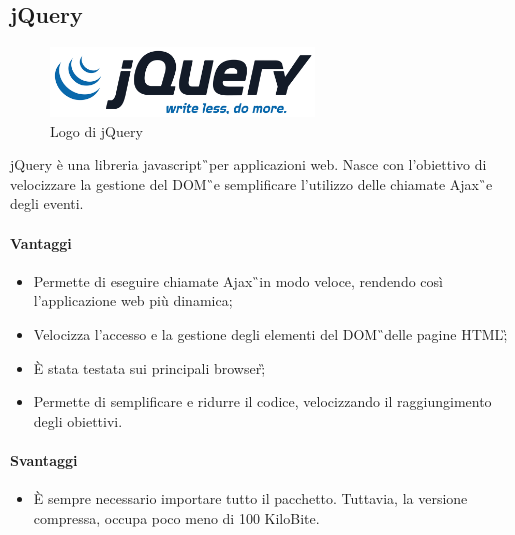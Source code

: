 \subsection{jQuery}
	\begin{figure}[H]
		\begin{center}
			\includegraphics[width=7cm]{Pics/jquery_logo.png}
			\caption{Logo di jQuery}
			\label{fig:jQueryLogo}
		\end{center}
	\end{figure}
	jQuery è una libreria \gls{javascript}\G\ per applicazioni web. Nasce con l'obiettivo di velocizzare la gestione del \gls{DOM}\G\  e semplificare l'utilizzo delle chiamate \gls{Ajax}\G\ e degli eventi.
\paragraph{Vantaggi}
	\begin{itemize}
		\item Permette di eseguire chiamate \gls{Ajax}\G\ in modo veloce, rendendo così l'applicazione web più dinamica;
		\item Velocizza l'accesso e la gestione degli elementi del \gls{DOM}\G\ delle pagine \gls{HTML}\G;
		\item È stata testata sui principali \gls{browser}\G;
		\item Permette di semplificare e ridurre il codice, velocizzando il raggiungimento degli obiettivi. 
	\end{itemize}
\paragraph{Svantaggi}
	\begin{itemize}
		\item È sempre necessario importare tutto il pacchetto. Tuttavia, la versione compressa, occupa poco meno di 100 KiloBite. 
\end{itemize}